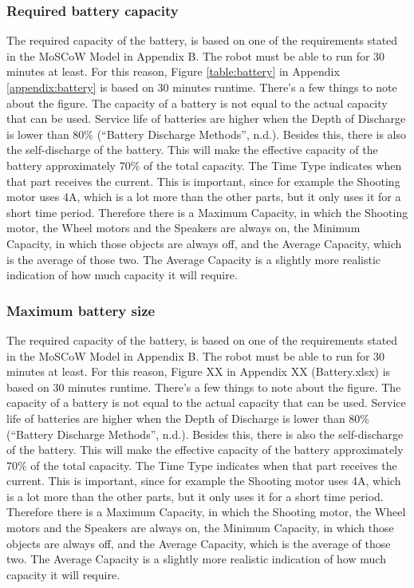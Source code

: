 \documentclass[11pt,twoside,a4paper]{report}
\begin{document}
\subsubsection{Required battery capacity}
The required capacity of the battery, is based on one of the requirements stated in the MoSCoW Model in Appendix B. The robot must be able to run for 30 minutes at least. For this reason, Figure \ref{table:battery} in Appendix \ref{appendix:battery} is based on 30 minutes runtime. 
There’s a few things to note about the figure. The capacity of a battery is not equal to the actual capacity that can be used. Service life of batteries are higher when the Depth of Discharge is lower than 80\% (“Battery Discharge Methods”, n.d.). Besides this, there is also the self-discharge of the battery. This will make the effective capacity of the battery approximately 70\% of the total capacity. 
The Time Type indicates when that part receives the current. This is important, since for example the Shooting motor uses 4A, which is a lot more than the other parts, but it only uses it for a short time period. Therefore there is a Maximum Capacity, in which the Shooting motor, the Wheel motors and the Speakers are always on, the Minimum Capacity, in which those objects are always off, and the Average Capacity, which is the average of those two. The Average Capacity is a slightly more realistic indication of how much capacity it will require. 
\subsubsection{Maximum battery size}
The required capacity of the battery, is based on one of the requirements stated in the MoSCoW Model in Appendix B. The robot must be able to run for 30 minutes at least. For this reason, Figure XX in Appendix XX (Battery.xlsx) is based on 30 minutes runtime. 
There’s a few things to note about the figure. The capacity of a battery is not equal to the actual capacity that can be used. Service life of batteries are higher when the Depth of Discharge is lower than 80\% (“Battery Discharge Methods”, n.d.). Besides this, there is also the self-discharge of the battery. This will make the effective capacity of the battery approximately 70\% of the total capacity. 
The Time Type indicates when that part receives the current. This is important, since for example the Shooting motor uses 4A, which is a lot more than the other parts, but it only uses it for a short time period. Therefore there is a Maximum Capacity, in which the Shooting motor, the Wheel motors and the Speakers are always on, the Minimum Capacity, in which those objects are always off, and the Average Capacity, which is the average of those two. The Average Capacity is a slightly more realistic indication of how much capacity it will require.
\end{document}
